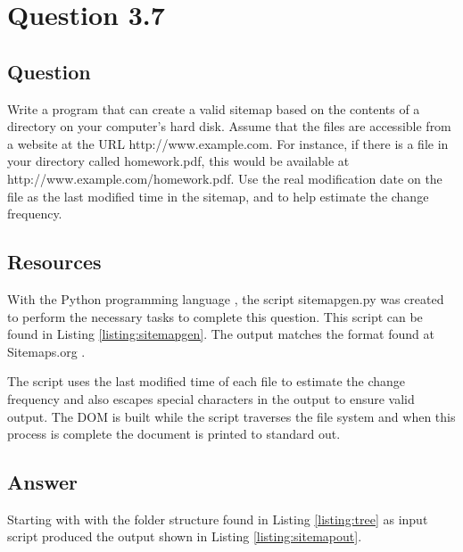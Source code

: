 \section{Question 3.7}

\subsection{Question}
Write a program that can create a valid sitemap based on the contents of a directory on your computer's hard disk. Assume that the files are accessible from a website at the URL http://www.example.com. For instance, if there is a file in your directory called homework.pdf, this would be available at http://www.example.com/homework.pdf. Use the real modification date on the file as the last modified time in the sitemap, and to help estimate the change frequency.

\subsection{Resources}
With the Python programming language \cite{python}, the script {\ttfamily sitemapgen.py} was created to perform the necessary tasks to complete this question.  This script can be found in Listing \ref{listing:sitemapgen}.  The output matches the format found at Sitemaps.org \cite{sitemaps}.

The script uses the last modified time of each file to estimate the change frequency and also escapes special characters in the output to ensure valid output.  The DOM is built while the script traverses the file system and when this process is complete the document is printed to standard out.

\subsection{Answer}
Starting with with the folder structure found in Listing \ref{listing:tree} as input script produced the output shown in Listing \ref{listing:sitemapout}.




